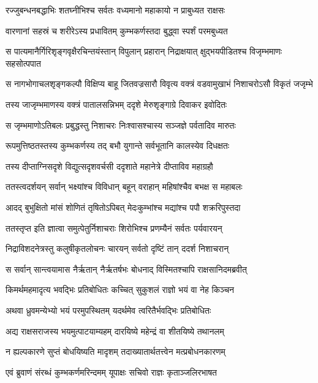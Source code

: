 \twolineshloka
{रज्जुबन्धनबद्धाभिः शतघ्नीभिश्च सर्वतः}
{वध्यमानो महाकायो न प्राबुध्यत राक्षसः} %

\twolineshloka
{वारणानां सहस्रं च शरीरेऽस्य प्रधावितम्}
{कुम्भकर्णस्तदा बुद्ध्वा स्पर्शं परमबुध्यत} %

\twolineshloka
{स पात्यमानैर्गिरिशृङ्गवृक्षैरचिन्तयंस्तान् विपुलान् प्रहारान्}
{निद्राक्षयात् क्षुद्भयपीडितश्च विजृम्भमाणः सहसोत्पपात} %

\twolineshloka
{स नागभोगाचलशृङ्गकल्पौ विक्षिप्य बाहू जितवज्रसारौ}
{विवृत्य वक्त्रं वडवामुखाभं निशाचरोऽसौ विकृतं जजृम्भे} %

\twolineshloka
{तस्य जाजृम्भमाणस्य वक्त्रं पातालसन्निभम्}
{ददृशे मेरुशृङ्गाग्रे दिवाकर इवोदितः} %

\twolineshloka
{स जृम्भमाणोऽतिबलः प्रबुद्धस्तु निशाचरः}
{निःश्वासश्चास्य सञ्जज्ञे पर्वतादिव मारुतः} %

\twolineshloka
{रूपमुत्तिष्ठतस्तस्य कुम्भकर्णस्य तद् बभौ}
{युगान्ते सर्वभूतानि कालस्येव दिधक्षतः} %

\twolineshloka
{तस्य दीप्ताग्निसदृशे विद्युत्सदृशवर्चसी}
{ददृशाते महानेत्रे दीप्ताविव महाग्रहौ} %

\twolineshloka
{ततस्त्वदर्शयन् सर्वान् भक्ष्यांश्च विविधान् बहून्}
{वराहान् महिषांश्चैव बभक्ष स महाबलः} %

\twolineshloka
{आदद् बुभुक्षितो मांसं शोणितं तृषितोऽपिबत्}
{मेदःकुम्भांश्च मद्यांश्च पपौ शक्ररिपुस्तदा} %

\twolineshloka
{ततस्तृप्त इति ज्ञात्वा समुत्पेतुर्निशाचराः}
{शिरोभिश्च प्रणम्यैनं सर्वतः पर्यवारयन्} %

\twolineshloka
{निद्राविशदनेत्रस्तु कलुषीकृतलोचनः}
{चारयन् सर्वतो दृष्टिं तान् ददर्श निशाचरान्} %

\twolineshloka
{स सर्वान् सान्त्वयामास नैर्ऋतान् नैर्ऋतर्षभः}
{बोधनाद् विस्मितश्चापि राक्षसानिदमब्रवीत्} %

\twolineshloka
{किमर्थमहमादृत्य भवद्भिः प्रतिबोधितः}
{कच्चित् सुकुशलं राज्ञो भयं वा नेह किञ्चन} %

\twolineshloka
{अथवा ध्रुवमन्येभ्यो भयं परमुपस्थितम्}
{यदर्थमेव त्वरितैर्भवद्भिः प्रतिबोधितः} %

\twolineshloka
{अद्य राक्षसराजस्य भयमुत्पाटयाम्यहम्}
{दारयिष्ये महेन्द्रं वा शीतयिष्ये तथानलम्} %

\twolineshloka
{न ह्यल्पकारणे सुप्तं बोधयिष्यति मादृशम्}
{तदाख्यातार्थतत्त्वेन मत्प्रबोधनकारणम्} %

\twolineshloka
{एवं ब्रुवाणं संरब्धं कुम्भकर्णमरिन्दमम्}
{यूपाक्षः सचिवो राज्ञः कृताञ्जलिरभाषत} %

